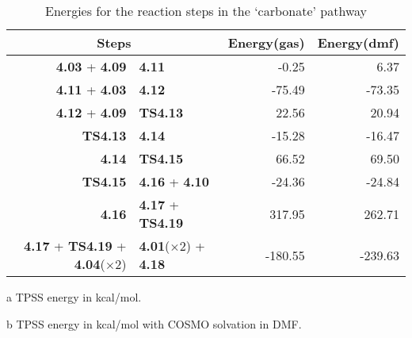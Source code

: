 \begin{table}[!htb]
\centering
 \begin{threeparttable}
  \caption{Energies for the reaction steps in the `carbonate' pathway}
    \begin{tabular}{r@{ $\rightarrow$ }lrr}
    \toprule
    \multicolumn{2}{c}{Steps} & Energy(gas)\tnote{a} & Energy(dmf)\tnote{b} \\
    \midrule
    \textbf{4.03} + \textbf{4.09} & \textbf{4.11} & -0.25 & 6.37 \\
    \textbf{4.11} + \textbf{4.03} & \textbf{4.12} & -75.49 & -73.35 \\
    \textbf{4.12} + \textbf{4.09} & \textbf{TS4.13} & 22.56 & 20.94 \\
    \textbf{TS4.13} & \textbf{4.14} & -15.28 & -16.47 \\
    \textbf{4.14} & \textbf{TS4.15} & 66.52 & 69.50 \\
    \textbf{TS4.15} & \textbf{4.16} + \textbf{4.10} & -24.36 & -24.84 \\
    \textbf{4.16} & \textbf{4.17} + \textbf{TS4.19} & 317.95 & 262.71 \\
    \textbf{4.17} + \textbf{TS4.19} + \textbf{4.04}($\times 2$) & \textbf{4.01}($\times 2$) + \textbf{4.18} & -180.55 & -239.63 \\
    \bottomrule
    \end{tabular}%
    \begin{tablenotes}
    \item [a] TPSS energy in kcal/mol.
    \item [b] TPSS energy in kcal/mol with COSMO solvation in DMF.
    \end{tablenotes}
  \label{tab.carbrxn}%
 \end{threeparttable}
\end{table}%

